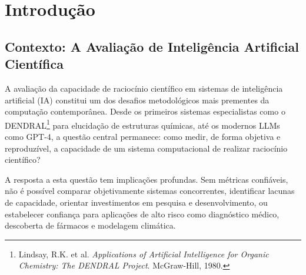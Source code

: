 \documentclass[12pt,a4paper,oneside]{article}
\begin{document}
\begin{abstract}
\textbf{Conclus{\~a}o.} O ecossistema demonstrou capacidade de racioc{\'\i}nio avan{\c c}ado
em benchmark pr{\'o}prio. A transpar{\^e}ncia sobre limita{\c c}{\~o}es --- score ajustado,
vi{\'e}s de sele{\c c}{\~a}o, calibra{\c c}{\~a}o parcial, reprodu{\c c}{\~a}o pendente por terceiros,
generaliza{\c c}{\~a}o n{\~a}o testada, 8/10 dimens{\~o}es com apenas valida{\c c}{\~a}o interna ---
{\'e} parte integrante da contribui{\c c}{\~a}o metodol{\'o}gica. Documento auto-publicado,
sem revis{\~a}o por pares.

\vspace{6pt}
\noindent\textbf{Palavras-chave:} benchmark cient{\'\i}fico, verifica{\c c}{\~a}o simb{\'o}lica,
racioc{\'\i}nio multiagente, CORA-Debate, OpenCode Ecosystem, calibra{\c c}{\~a}o de
verificadores, Geometric Arbitrage Theory, Project Euler, Rosalind, TDD.
\end{abstract}

\newpage\tableofcontents\newpage


\section{Introdução}

\subsection{Contexto: A Avaliação de Inteligência Artificial Científica}

A avaliação da capacidade de raciocínio científico em sistemas de inteligência
artificial (IA) constitui um dos desafios metodológicos mais prementes da
computação contemporânea. Desde os primeiros sistemas especialistas como o
DENDRAL\footnote{Lindsay, R.K. et al. \textit{Applications of Artificial
Intelligence for Organic Chemistry: The DENDRAL Project}. McGraw-Hill, 1980.}
para elucidação de estruturas químicas, até os modernos LLMs como GPT-4, a
questão central permanece: como medir, de forma objetiva e reproduzível, a
capacidade de um sistema computacional de realizar raciocínio científico?

A resposta a esta questão tem implicações profundas. Sem métricas confiáveis,
não é possível comparar objetivamente sistemas concorrentes, identificar
lacunas de capacidade, orientar investimentos em pesquisa e desenvolvimento,
ou estabelecer confiança para aplicações de alto risco como diagnóstico médico,
descoberta de fármacos e modelagem climática.
\end{document}
